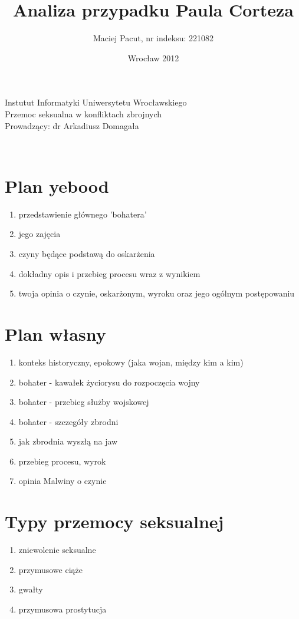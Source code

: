 \documentclass[12pt,a4paper]{article}
\title{Analiza przypadku Paula Corteza}
\author{Maciej Pacut, nr indeksu: 221082}
\date{Wrocław 2012}
\makeatletter
\renewcommand{\maketitle}{\begin{titlepage}
    \vspace*{1cm}
    \begin{center}
      Instutut Informatyki Uniwersytetu Wrocławskiego\\
      Przemoc seksualna w konfliktach zbrojnych \\
      Prowadzący: dr Arkadiusz Domagała \\
      \vspace{3cm}
      \normalsize \@author \par
      \vspace{0.8cm}
      \noindent
      \LARGE \textsc{\@title}\\
      \vspace{1cm}
      \normalsize
    \end{center}
    \vspace{0.5cm}
    \begin{flushright}
      \vspace{5cm}
    \end{flushright}
    \vspace*{\stretch{6}}
    \begin{center}
      \@date
    \end{center}
  \end{titlepage}%
}
\makeatother
\begin{document}
\maketitle
\newpage

\section{Plan yebood}

\begin{enumerate}
\item przedstawienie głównego 'bohatera'
\item jego zajęcia
\item czyny będące podstawą do oskarżenia
\item dokładny opis i przebieg procesu wraz z wynikiem
\item twoja opinia o czynie, oskarżonym, wyroku oraz jego ogólnym postępowaniu
\end{enumerate}

\section{Plan własny}

\begin{enumerate}
\item konteks historyczny, epokowy (jaka wojan, między kim a kim)
\item bohater - kawałek życiorysu do rozpoczęcia wojny
\item bohater - przebieg służby wojskowej
\item bohater - szczegóły zbrodni
\item jak zbrodnia wyszłą na jaw
\item przebieg procesu, wyrok
\item opinia Malwiny o czynie
\end{enumerate}

\section{Typy przemocy seksualnej}


\begin{enumerate}
\item zniewolenie seksualne
\item przymusowe ciąże
\item gwałty
\item przymusowa prostytucja
\end{enumerate}
\end{document}
